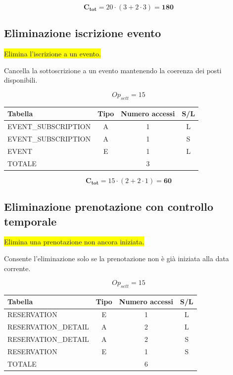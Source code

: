 \documentclass[a4paper,12pt]{report}
\begin{document}
$$\mathbf{C_{tot}} = 20 \cdot (3 + 2 \cdot 3) = \mathbf{180}$$

\subsection*{Eliminazione iscrizione evento} \label{op17}
\colorbox{yellow}{Elimina l'iscrizione a un evento.}

Cancella la sottoscrizione a un evento mantenendo la coerenza dei
posti disponibili.

$$Op_{sett} = 15$$

\begin{table}[H]
  \centering
  \small
  \renewcommand{\arraystretch}{1.15}
  \begin{tabularx}{0.8\textwidth}{|X|c|c|c|}
    \hline
    \rowcolor{gray!20}
    \textbf{Tabella} & \textbf{Tipo} & \textbf{Numero accessi} & \textbf{S/L} \\
    \hline
    EVENT\_SUBSCRIPTION & A & 1 & L \\
    EVENT\_SUBSCRIPTION & A & 1 & S \\
    EVENT & E & 1 & L \\
    \hline
    \rowcolor{gray!20}
    TOTALE & & 3 & \\
    \hline
  \end{tabularx}
  \vspace{-1em}
\end{table}

$$\mathbf{C_{tot}} = 15 \cdot (2 + 2 \cdot 1) = \mathbf{60}$$

\subsection*{Eliminazione prenotazione con controllo temporale} \label{op18}
\colorbox{yellow}{Elimina una prenotazione non ancora iniziata.}

Consente l'eliminazione solo se la prenotazione non è già iniziata
alla data corrente.

$$Op_{sett} = 15$$

\begin{table}[H]
  \centering
  \small
  \renewcommand{\arraystretch}{1.15}
  \begin{tabularx}{0.8\textwidth}{|X|c|c|c|}
    \hline
    \rowcolor{gray!20}
    \textbf{Tabella} & \textbf{Tipo} & \textbf{Numero accessi} & \textbf{S/L} \\
    \hline
    RESERVATION & E & 1 & L \\
    RESERVATION\_DETAIL & A & 2 & L \\
    RESERVATION\_DETAIL & A & 2 & S \\
    RESERVATION & E & 1 & S \\
    \hline
    \rowcolor{gray!20}
    TOTALE & & 6 & \\
    \hline
  \end{tabularx}
  \vspace{-1em}
\end{table}
\end{document}
